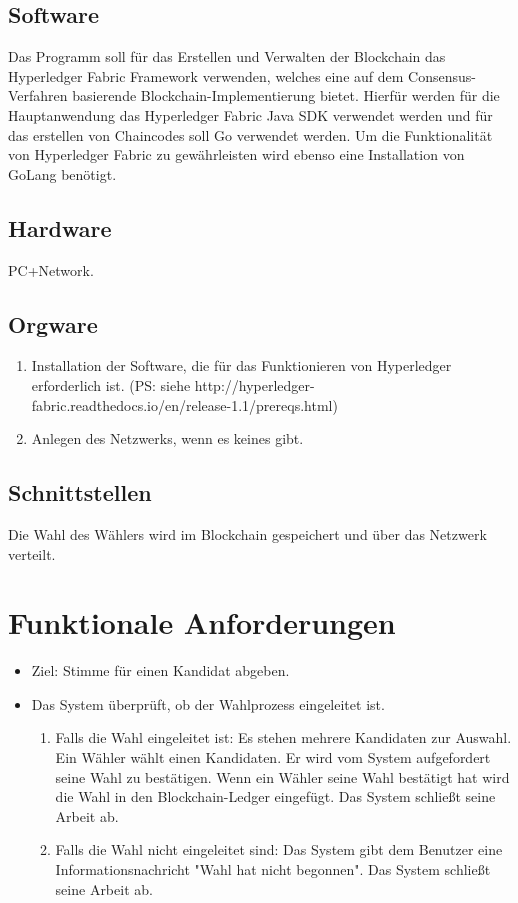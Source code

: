 \documentclass[parskip=full,11pt,twoside]{scrartcl}
\begin{document}
\subsection{Software}
Das Programm soll für das Erstellen und Verwalten der Blockchain das Hyperledger Fabric Framework verwenden, welches eine auf dem Consensus-Verfahren basierende Blockchain-Implementierung bietet.
Hierfür werden für die Hauptanwendung das Hyperledger Fabric Java SDK verwendet werden und für  das erstellen von Chaincodes soll Go verwendet werden.
Um die Funktionalität von Hyperledger Fabric zu gewährleisten wird ebenso eine Installation von GoLang benötigt.

\subsection{Hardware}
PC+Network.

\subsection{Orgware}
\begin{enumerate}
\item Installation der Software, die für das Funktionieren von Hyperledger erforderlich ist. (PS: siehe http://hyperledger-fabric.readthedocs.io/en/release-1.1/prereqs.html)
\item Anlegen des Netzwerks, wenn es keines gibt.
\end{enumerate}

\subsection{Schnittstellen}
Die Wahl des Wählers wird im Blockchain gespeichert und über das Netzwerk verteilt.

\section{Funktionale Anforderungen}

\begin{itemize}
	\item Ziel: Stimme für einen Kandidat abgeben.
	\item Das System überprüft, ob der Wahlprozess eingeleitet ist.  
	\begin{enumerate}
		\item Falls die Wahl eingeleitet ist: Es stehen mehrere Kandidaten zur Auswahl. Ein Wähler wählt einen Kandidaten. Er wird vom System aufgefordert seine Wahl zu bestätigen. Wenn ein Wähler seine Wahl bestätigt hat wird die Wahl in den Blockchain-Ledger eingefügt. Das System schließt seine Arbeit ab.
		\item Falls die Wahl nicht eingeleitet sind: Das System gibt dem Benutzer eine Informationsnachricht "Wahl hat nicht begonnen". Das System schließt seine Arbeit ab.
	\end{enumerate}
\end{itemize}
\end{document}
